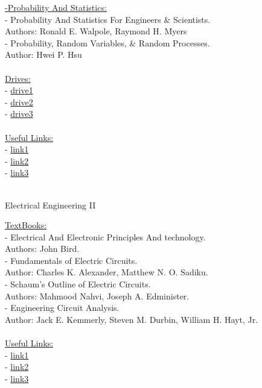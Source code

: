 \documentclass{article}
\begin{document}
\underline{\large -Probability And Statistics:} \\[0.15cm]
\indent - Probability And Statistics For Engineers \& Scientists. \\ 
\indent \indent Authors: Ronald E. Walpole, Raymond H. Myers\\
\indent - Probability, Random Variables, \& Random Processes. \\ 
\indent \indent Author: Hwei P. Hsu\\ \\


\noindent \underline{\Large Drives:}\\
- \href{URL}{drive1}\\
- \href{URL}{drive2}\\
- \href{URL}{drive3}\\\\
\underline{\Large Useful Links:}\\
- \href{URL}{link1}\\
- \href{URL}{link2}\\
- \href{URL}{link3}\\\\
   
   
\newpage
\begin{center}
    \huge Electrical Engineering II
\end{center}
\underline{\Large TextBooks:}\\ [0.15cm]
- Electrical And Electronic Principles And technology.\\
\indent Authors: John Bird. \\
- Fundamentals of Electric Circuits.\\
\indent Author: Charles K. Alexander, Matthew N. O. Sadiku.\\ 
- Schaum's Outline of Electric Circuits.\\
\indent Authors: Mahmood Nahvi, Joseph A. Edminister.\\
- Engineering Circuit Analysis.\\
\indent Author: Jack E. Kemmerly, Steven M. Durbin, William H. Hayt, Jr.\\ \\

\noindent\underline{\Large Useful Links:}\\
- \href{URL}{link1}\\
- \href{URL}{link2}\\
- \href{URL}{link3}\\\\
   
\end{document}
